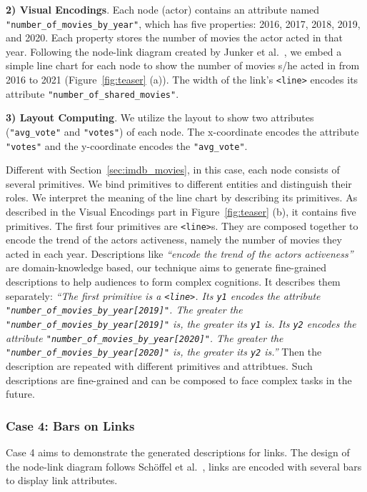 \textbf{2) Visual Encodings}. 
Each node (actor) contains an attribute named \texttt{"number\_of\_movies\_by\_year"}, which has five properties: 2016, 2017, 2018, 2019, and 2020.
Each property stores the number of movies the actor acted in that year.
Following the node-link diagram created by Junker et al.~\cite{DBLP:journals/bmcbi/JunkerKS06}, 
we embed a simple line chart for each node to show the number of movies s/he acted in from 2016 to 2021 (Figure~\ref{fig:teaser} (a)). 
The width of the link's \texttt{<line>} encodes its attribute \texttt{"number\_of\_shared\_movies"}.

\textbf{3) Layout Computing}. We utilize the layout to show two attributes (\texttt{"avg\_vote"} and \texttt{"votes"}) of each node. The x-coordinate encodes the attribute \texttt{"votes"} and the y-coordinate encodes the \texttt{"avg\_vote"}.

Different with Section~\ref{sec:imdb_movies}, in this case, each node consists of several primitives.
We bind primitives to different entities and distinguish their roles.
We interpret the meaning of the line chart by describing its primitives.
As described in the Visual Encodings part in Figure~\ref{fig:teaser} (b), it contains five primitives.
The first four primitives are \texttt{<line>}s.
They are composed together to encode the trend of the actors activeness, namely the number of movies they acted in each year.
Descriptions like \textit{``encode the trend of the actors activeness''} are domain-knowledge based,
our technique aims to generate fine-grained descriptions to help audiences to form complex cognitions.
It describes them separately: 
\textit{``The first primitive is a \texttt{<line>}. 
Its \texttt{y1} encodes the attribute \texttt{"number\_of\_movies\_by\_year[2019]"}. 
The greater the \texttt{"number\_of\_movies\_by\_year[2019]"} is, the greater its \texttt{y1} is. 
Its \texttt{y2} encodes the attribute \texttt{"number\_of\_movies\_by\_year[2020]"}.
The greater the \texttt{"number\_of\_movies\_by\_year[2020]"} is, the greater its \texttt{y2} is.''}
Then the description are repeated with different primitives and attribtues.
Such descriptions are fine-grained and can be composed to face complex tasks in the future.


\subsubsection{Case 4: Bars on Links}
Case 4 aims to demonstrate the generated descriptions for links.
The design of the node-link diagram follows Sch{\"{o}}ffel et al.~\cite{DBLP:conf/iv/SchoffelSE16}, links are encoded with several bars to display link attributes.

